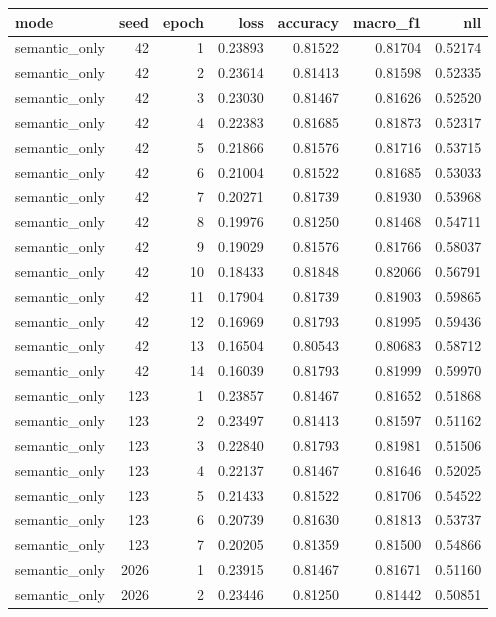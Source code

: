 \begin{tabular}{lrrrrrr}
\toprule
mode & seed & epoch & loss & accuracy & macro_f1 & nll \\
\midrule
semantic_only & 42 & 1 & 0.23893 & 0.81522 & 0.81704 & 0.52174 \\
semantic_only & 42 & 2 & 0.23614 & 0.81413 & 0.81598 & 0.52335 \\
semantic_only & 42 & 3 & 0.23030 & 0.81467 & 0.81626 & 0.52520 \\
semantic_only & 42 & 4 & 0.22383 & 0.81685 & 0.81873 & 0.52317 \\
semantic_only & 42 & 5 & 0.21866 & 0.81576 & 0.81716 & 0.53715 \\
semantic_only & 42 & 6 & 0.21004 & 0.81522 & 0.81685 & 0.53033 \\
semantic_only & 42 & 7 & 0.20271 & 0.81739 & 0.81930 & 0.53968 \\
semantic_only & 42 & 8 & 0.19976 & 0.81250 & 0.81468 & 0.54711 \\
semantic_only & 42 & 9 & 0.19029 & 0.81576 & 0.81766 & 0.58037 \\
semantic_only & 42 & 10 & 0.18433 & 0.81848 & 0.82066 & 0.56791 \\
semantic_only & 42 & 11 & 0.17904 & 0.81739 & 0.81903 & 0.59865 \\
semantic_only & 42 & 12 & 0.16969 & 0.81793 & 0.81995 & 0.59436 \\
semantic_only & 42 & 13 & 0.16504 & 0.80543 & 0.80683 & 0.58712 \\
semantic_only & 42 & 14 & 0.16039 & 0.81793 & 0.81999 & 0.59970 \\
semantic_only & 123 & 1 & 0.23857 & 0.81467 & 0.81652 & 0.51868 \\
semantic_only & 123 & 2 & 0.23497 & 0.81413 & 0.81597 & 0.51162 \\
semantic_only & 123 & 3 & 0.22840 & 0.81793 & 0.81981 & 0.51506 \\
semantic_only & 123 & 4 & 0.22137 & 0.81467 & 0.81646 & 0.52025 \\
semantic_only & 123 & 5 & 0.21433 & 0.81522 & 0.81706 & 0.54522 \\
semantic_only & 123 & 6 & 0.20739 & 0.81630 & 0.81813 & 0.53737 \\
semantic_only & 123 & 7 & 0.20205 & 0.81359 & 0.81500 & 0.54866 \\
semantic_only & 2026 & 1 & 0.23915 & 0.81467 & 0.81671 & 0.51160 \\
semantic_only & 2026 & 2 & 0.23446 & 0.81250 & 0.81442 & 0.50851 \\

\end{tabular}
